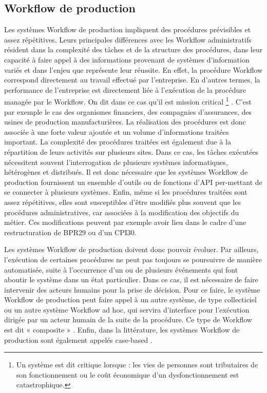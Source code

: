 \subsection{Workflow de production} 
Les systèmes Workflow de production impliquent des procédures prévisibles et assez répétitives. Leurs principales différences avec les Workflow administratifs résident dans la
complexité des tâches et de la structure des procédures, dans leur capacité à faire appel à des
informations provenant de systèmes d’information variés et dans l’enjeu que représente leur
réussite. En effet, la procédure Workflow correspond directement au travail effectué par
l’entreprise. En d’autres termes, la performance de l’entreprise est directement liée à
l’exécution de la procédure managée par le Workflow. On dit dans ce cas qu’il est mission
critical \footnote[1]{\samepage  Un système est dit critique lorsque : les vies de personnes sont tributaires de son fonctionnement ou le coût économique d'un dysfonctionnement est catastrophique. } \parencite{InConcert}. C’est par exemple le cas des organismes financiers, des compagnies d’assurances, des usines de production manufacturières. La réalisation des procédures
est donc associée à une forte valeur ajoutée et un volume d’informations traitées important.
La complexité des procédures traitées est également due à la répartition de leurs activités
sur plusieurs sites. Dans ce cas, les tâches exécutées nécessitent souvent l’interrogation de
plusieurs systèmes informatiques, hétérogènes et distribués. Il est donc nécessaire que les systèmes Workflow de production fournissent un ensemble d’outils ou de fonctions d’API per-mettant de se connecter à plusieurs systèmes. Enfin, même si les procédures traitées sont assez répétitives, elles sont susceptibles d’être modifiés plus souvent que les procédures administratives, car associées à la modification des objectifs du métier. Ces modifications peuvent
par exemple avoir lieu dans le cadre d’une restructuration de BPR29 ou d’un CPI30. 

Les systèmes Workflow de production doivent donc pouvoir évoluer. Par ailleurs,
l’exécution de certaines procédures ne peut pas toujours se poursuivre de manière automatisée, suite à l’occurrence d’un ou de plusieurs événements qui font aboutir le système dans un
état particulier. Dans ce cas, il est nécessaire de faire intervenir des acteurs humains pour la
prise de décision. Pour ce faire, le système Workflow de production peut faire appel à un autre système, de type collecticiel ou un autre système Workflow ad hoc, qui servira d’interface
pour l’exécution dirigée par un acteur humain de la suite de la procédure. Ce type de Workflow est dit « composite » \parencite{Eder} . Enfin, dans la littérature, les systèmes Workflow de
production sont également appelés case-based \parencite{VanderAalst}. 

